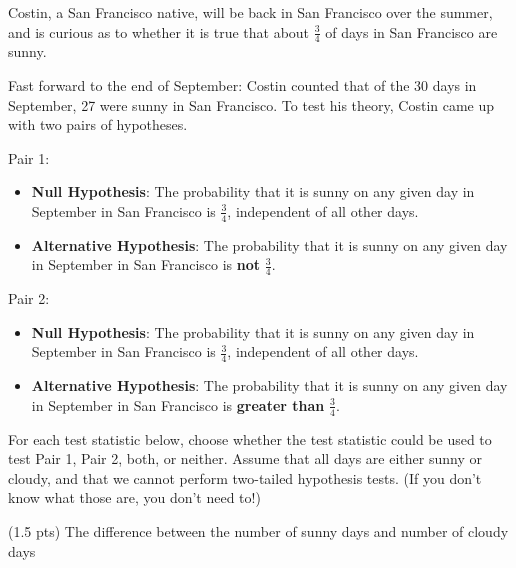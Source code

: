 \newpage

\begin{prob}[(6 pts)]

Costin, a San Francisco native, will be back in San Francisco over the summer, and is curious as to whether it is true that about $\frac{3}{4}$ of days in San Francisco are sunny.

Fast forward to the end of September: Costin counted that of the 30 days in September, 27 were sunny in San Francisco. To test his theory, Costin came up with two pairs of hypotheses.

Pair 1:

\begin{itemize}
    \item \textbf{Null Hypothesis}: The probability that it is sunny on any given day in September in San Francisco is $\frac{3}{4}$, independent of all other days.
    \item \textbf{Alternative Hypothesis}: The probability that it is sunny on any given day in September in San Francisco is \textbf{not} $\frac{3}{4}$.
\end{itemize}

Pair 2:

\begin{itemize}
    \item \textbf{Null Hypothesis}: The probability that it is sunny on any given day in September in San Francisco is $\frac{3}{4}$, independent of all other days.
    \item \textbf{Alternative Hypothesis}: The probability that it is sunny on any given day in September in San Francisco is \textbf{greater than} $\frac{3}{4}$.
\end{itemize}

For each test statistic below, choose whether the test statistic could be used to test Pair 1, Pair 2, both, or neither. Assume that all days are either sunny or cloudy, and that we cannot perform two-tailed hypothesis tests. (If you don't know what those are, you don't need to!)

\begin{subprobset}

\begin{subprob}(1.5 pts) The difference between the number of sunny days and number of cloudy days


\end{subprob}


\end{subprobset}
\end{prob}
